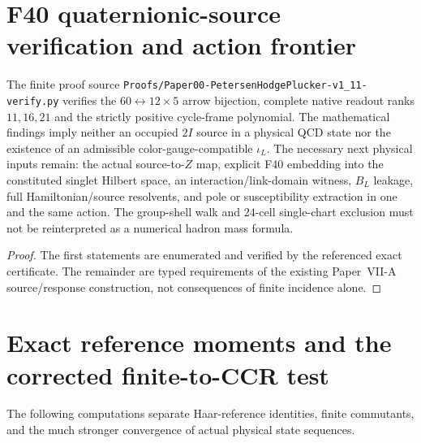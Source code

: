 \documentclass[12pt,a4paper]{article}
\begin{document}
\clearpage
\section{F40 quaternionic-source verification and action frontier}
\label{p12:sec:v345-f40-action-ledger}
\begin{proposition}
\label{p12:prop:v345-f40-execution-ledger}
The finite proof source
\texttt{Proofs/Paper00-PetersenHodgePlucker-v1\_11-verify.py}
verifies the $60\leftrightarrow12\times5$ arrow bijection,
complete native readout ranks $11,16,21$ and the strictly positive
cycle-frame polynomial.  The mathematical findings imply neither
an occupied $2I$ source in a physical QCD state nor the existence
of an admissible color-gauge-compatible $\iota_L$.
The necessary next physical inputs remain: the actual
source-to-$Z$ map, explicit F40 embedding into the constituted
singlet Hilbert space, an interaction/link-domain witness,
$B_L$ leakage, full Hamiltonian/source resolvents, and pole
or susceptibility extraction in one and the same action.
The group-shell walk and $24$-cell single-chart exclusion
must not be reinterpreted as a numerical hadron mass formula.
\end{proposition}
\begin{proof}
The first statements are enumerated and verified by the
referenced exact certificate.  The remainder are typed
requirements of the existing Paper~VII-A source/response
construction, not consequences of finite incidence alone.
\end{proof}

\clearpage
\section{Exact reference moments and the corrected finite-to-CCR test}
\label{p12:sec:v350-technical-repair}
The following computations separate Haar-reference identities,
finite commutants, and the much stronger convergence of actual
physical state sequences.
\end{document}
